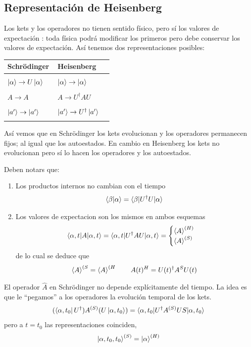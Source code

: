 \documentclass[10pt,oneside]{CBFT_book}
\begin{document}
\subsection{Representación de Heisenberg}

Los kets y los operadores no tienen sentido físico, pero sí los valores de expectación : toda física podrá modificar 
los primeros pero debe conservar los valores de expectación. Así tenemos dos representaciones posibles:

\begin{center}
\begin{tabular}{|l|l|}
\hline
Schrödinger & Heisenberg \\
\hline
& \\
$\Ket{\alpha} \to U\Ket{\alpha} \quad $ & $\Ket{\alpha} \to \Ket{\alpha} \quad $ \\
& \\
$A \to A \quad $ & $A \to U^\dagger AU \quad$ \\
& \\
$\Ket{a'} \to \Ket{a'} \quad $ & $\Ket{a'} \to U^\dagger \Ket{a'} \quad $ \\
& \\
\hline
\end{tabular}
\end{center}
Así vemos que en Schrödinger los kets evolucionan y los operadores permanecen fijos; al igual que los autoestados.
En cambio en Heisenberg los kets no evolucionan pero sí lo hacen los operadores y los autoestados.

Deben notars que:
\begin{enumerate}
 \item Los productos internos no cambian con el tiempo
 \[
	\braket{\beta|\alpha} = \braket{\beta|U^\dagger U|\alpha} 
 \]
 \item Los valores de expectacion son los mismos en ambos esquemas
 \[
	\braket{\alpha,t|A|\alpha,t} = \braket{\alpha,t|U^\dagger AU|\alpha,t} =
	\begin{cases}
	 \braket{A}^{(H)} \\
	 \braket{A}^{(S)}
	\end{cases}
 \]
 de lo cual se deduce que 
 \[
	\Braket{A}^{(S} = \Braket{A}^{(H} \qquad A(t)^H = U(t)^\dagger A^S U(t)
 \]
\end{enumerate}

El operador $\hat{A}$ en Schrödinger no depende explícitamente del tiempo. La idea es que le ``pegamos'' a los 
operadores la evolución temporal de los kets.
\[
	(\Bra{ \alpha, t_0 } U^\dagger) A^{(S)} (U \Ket{\alpha, t_0 }) = 
	\braket{ \alpha, t_0 | U^\dagger A^{(S)} US | \alpha, t_0 }
\]
pero a $t=t_0$ las representaciones coinciden,
\[
	\Ket{\alpha,t_0,t_0}^{(S)} = \Ket{\alpha}^{(H)}
\]
\end{document}
